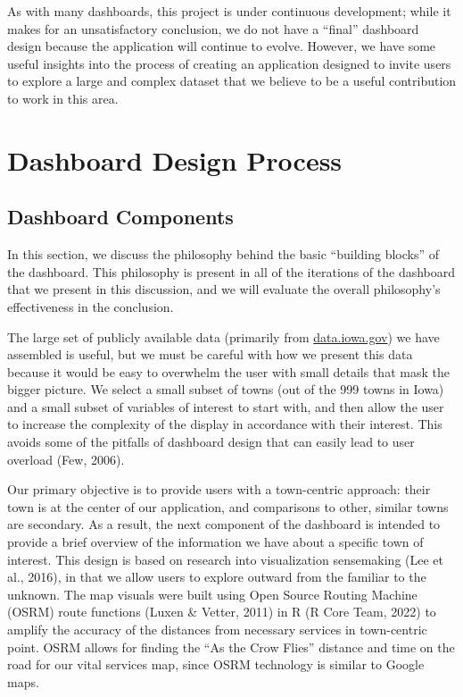 \documentclass[print]{nuthesis}
\begin{document}
As with many dashboards, this project is under continuous development; while it makes for an unsatisfactory conclusion, we do not have a ``final'' dashboard design because the application will continue to evolve. However, we have some useful insights into the process of creating an application designed to invite users to explore a large and complex dataset that we believe to be a useful contribution to work in this area.

\hypertarget{dashboard-design-process}{%
\section{Dashboard Design Process}\label{dashboard-design-process}}

\hypertarget{dashboard-components}{%
\subsection{Dashboard Components}\label{dashboard-components}}

In this section, we discuss the philosophy behind the basic ``building blocks'' of the dashboard. This philosophy is present in all of the iterations of the dashboard that we present in this discussion, and we will evaluate the overall philosophy's effectiveness in the conclusion.

The large set of publicly available data (primarily from \url{data.iowa.gov}) we have assembled is useful, but we must be careful with how we present this data because it would be easy to overwhelm the user with small details that mask the bigger picture. We select a small subset of towns (out of the 999 towns in Iowa) and a small subset of variables of interest to start with, and then allow the user to increase the complexity of the display in accordance with their interest. This avoids some of the pitfalls of dashboard design that can easily lead to user overload (Few, 2006).

Our primary objective is to provide users with a town-centric approach: their town is at the center of our application, and comparisons to other, similar towns are secondary. As a result, the next component of the dashboard is intended to provide a brief overview of the information we have about a specific town of interest. This design is based on research into visualization sensemaking (Lee et al., 2016), in that we allow users to explore outward from the familiar to the unknown. The map visuals were built using Open Source Routing Machine (OSRM) route functions (Luxen \& Vetter, 2011) in R (R Core Team, 2022) to amplify the accuracy of the distances from necessary services in town-centric point. OSRM allows for finding the ``As the Crow Flies'' distance and time on the road for our vital services map, since OSRM technology is similar to Google maps.
\end{document}
